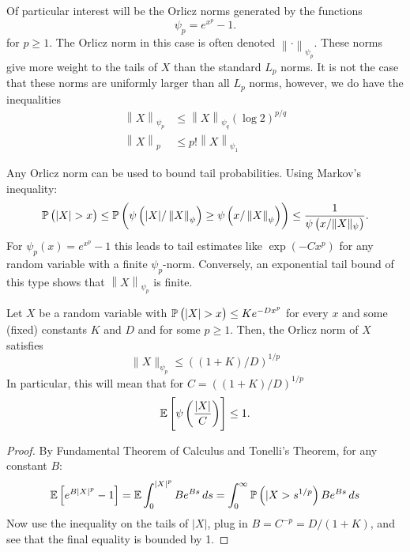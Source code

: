 \begin{remark*}
	Of particular interest will be the Orlicz norms generated by the functions
	\[
		\psi_p = e^{x^p}-1
	.\] 
	for \(p\geq 1\). The Orlicz norm in this case is often denoted \(\left\|\cdot\right\|_{\psi_p}\).  These norms give more weight to the tails of \(X\) than the standard  \(L_p\) norms. It is not the case that these norms are uniformly larger than all \(L_p\) norms, however, we do have the inequalities
	\begin{align*}
		\left\|X\right\|_{\psi_p} &\leq \left\|X\right\|_{\psi_q}\left(\log 2\right)^{p/q}\\ 
		\left\|X\right\|_p &\leq p!\left\|X\right\|_{\psi_1}
	\end{align*}
\end{remark*}

\begin{remark*}
    \label{rem:orlicz}
	Any Orlicz norm can be used to bound tail probabilities. Using Markov's inequality:
	\[
		\P\left(\left|X\right|>x\right)\leq \P\left(\psi\left(|X|/\left\|X\right\|_\psi\right)\geq \psi\left(x/\left\|X\right\|_\psi\right)\right) \leq \frac{1}{\psi\left(x/\|X\|_\psi\right)} 
	.\] 
	For \(\psi_p(x) = e^{x^p}-1\) this leads to tail estimates like  \(\exp\left(-Cx^p\right)\) for any random variable with a finite \(\psi_p\)-norm. Conversely, an exponential tail bound of this type shows that  \(\left\|X\right\|_{\psi_p}\) is finite.
\end{remark*}

\begin{lemma}
	\label{lemma:vdv2.2.1}
	Let \(X\) be a random variable  with  \(\P\left(|X|>x\right)\leq Ke^{-Dx^p}\) for every \(x\) and some (fixed) constants  \(K\) and  \(D\) and for some  \(p \geq 1\). Then, the Orlicz norm of \(X\) satisfies  \[\|X\|_{\psi_p}\leq \left((1+K)/D\right)^{1/p}\]
	In particular, this will mean that for \(C = \left((1+K)/D\right)^{1/p}\)
	\[
	    \mathbb{E}\left[\psi\left(\frac{|X|}{C}\right)\right]\leq 1
	.\] 
\end{lemma}
\begin{proof}
	By Fundamental Theorem of Calculus and Tonelli's Theorem, for any constant \(B\):
	\begin{align*}
		\mathbb{E}\left[e^{B|X|^p}-1\right]= \mathbb{E}\int_0^{|X|^p}Be^{Bs}\,ds = \int_0^\infty \mathbb{P}\left(|X> s^{1/p}\right)Be^{Bs}\,ds
	\end{align*}
	Now use the inequality on the tails of \(|X|\), plug in \(B = C^{-p}= D/(1+K)\), and see that the final equality is bounded by 1.
\end{proof}

